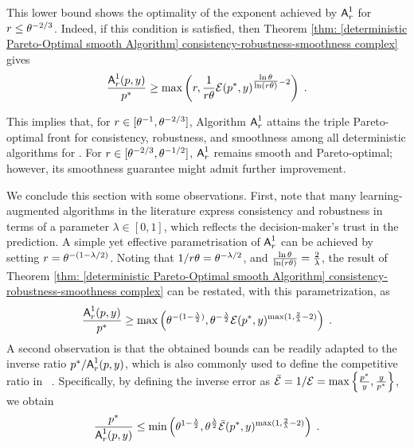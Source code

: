 This lower bound shows the optimality of the exponent achieved by $\mbox{\textup{\textsf{A}}}^1_r$ for $r \leq \theta^{-2/3}$. 
Indeed, if this condition is satisfied, then Theorem \ref{thm: [deterministic Pareto-Optimal smooth Algorithm] consistency-robustness-smoothness complex} gives
\[
\frac{\mbox{\textup{\textsf{A}}}^1_r(p, y)}{p^*} \geq 
\max\left(
r, \frac{1}{r \theta} \mathcal{E}(p^*,y)^{\tfrac{\ln \theta}{ \ln (r \theta)}-2}
\right)\;.
\]

This implies that, for $r \in [\theta^{-1}, \theta^{-2/3}]$, Algorithm $\mbox{\textup{\textsf{A}}}^1_r$ attains the triple Pareto-optimal front for consistency, robustness, and smoothness among all deterministic algorithms for \OMS{}. For $r \in [\theta^{-2/3}, \theta^{-1/2}]$, $\mbox{\textup{\textsf{A}}}^1_r$ remains smooth and Pareto-optimal; however, its smoothness guarantee might admit further improvement.


We conclude this section with some observations. First, note that many learning-augmented algorithms in the literature express consistency and robustness in terms of a parameter $\lambda \in [0,1]$, which reflects the decision-maker's trust in the prediction. 
A simple yet effective parametrisation of $\mbox{\textup{\textsf{A}}}^1_r$ can be achieved by setting $r = \theta^{-(1-\lambda/2)}$. Noting that $1/r \theta = \theta^{-\lambda/2}$, and $\frac{\ln \theta}{\ln (r \theta)} = \frac{2}{\lambda}$, the result of Theorem \ref{thm: [deterministic Pareto-Optimal smooth Algorithm] consistency-robustness-smoothness complex} can be restated, with this parametrization, as 
\[
\frac{\mbox{\textup{\textsf{A}}}^1_r(p, y)}{p^*} \geq 
\max\left(
\theta^{-(1-\frac{\lambda}{2})}, \theta^{-\frac{\lambda}{2}} \mathcal{E}(p^*,y)^{\max(1,\frac{2}{\lambda} - 2)}
\right)\;.
\]
A second observation is that the obtained bounds can be readily adapted to the inverse ratio $p^*/\mbox{\textup{\textsf{A}}}^1_r(p,y)$, which is also commonly used to define the competitive ratio in \OMS{}~\cite{el-yaniv_competitive_1998}.
Specifically, by defining the inverse error as $\Bar{\mathcal{E}} = 1/\mathcal{E} = \max\left\{\frac{p^*}{y}, \frac{y}{p^*}\right\}$, we obtain 
\[
\frac{p^*}{\mbox{\textup{\textsf{A}}}^1_r(p, y)} \leq 
\min\left(
\theta^{1-\frac{\lambda}{2}}, \theta^{\frac{\lambda}{2}} \Bar{\mathcal{E}}(p^*,y)^{\max(1,\frac{2}{\lambda} - 2)}
\right)\;.
\]

